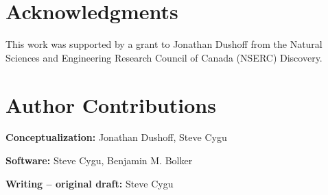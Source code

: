 \section*{Acknowledgments}

This work was supported by a grant to Jonathan Dushoff from the Natural Sciences and Engineering Research Council of Canada (NSERC) Discovery.

\section*{Author Contributions}

\textbf{Conceptualization:} Jonathan Dushoff, Steve Cygu

\noindent\textbf{Software:} Steve Cygu, Benjamin M. Bolker

\noindent\textbf{Writing – original draft:} Steve Cygu

\nolinenumbers

